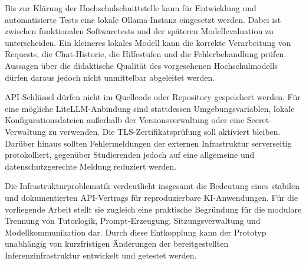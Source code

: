 Bis zur Klärung der Hochschulschnittstelle kann für Entwicklung und automatisierte Tests eine lokale Ollama-Instanz eingesetzt werden. Dabei ist zwischen funktionalen Softwaretests und der späteren Modellevaluation zu unterscheiden. Ein kleineres lokales Modell kann die korrekte Verarbeitung von Requests, die Chat-Historie, die Hilfestufen und die Fehlerbehandlung prüfen. Aussagen über die didaktische Qualität des vorgesehenen Hochschulmodells dürfen daraus jedoch nicht unmittelbar abgeleitet werden.

API-Schlüssel dürfen nicht im Quellcode oder Repository gespeichert werden. Für eine mögliche LiteLLM-Anbindung sind stattdessen Umgebungsvariablen, lokale Konfigurationsdateien außerhalb der Versionsverwaltung oder eine Secret-Verwaltung zu verwenden. Die TLS-Zertifikatsprüfung soll aktiviert bleiben. Darüber hinaus sollten Fehlermeldungen der externen Infrastruktur serverseitig protokolliert, gegenüber Studierenden jedoch auf eine allgemeine und datenschutzgerechte Meldung reduziert werden.

Die Infrastrukturproblematik verdeutlicht insgesamt die Bedeutung eines stabilen und dokumentierten API-Vertrags für reproduzierbare KI-Anwendungen. Für die vorliegende Arbeit stellt sie zugleich eine praktische Begründung für die modulare Trennung von Tutorlogik, Prompt-Erzeugung, Sitzungsverwaltung und Modellkommunikation dar. Durch diese Entkopplung kann der Prototyp unabhängig von kurzfristigen Änderungen der bereitgestellten Inferenzinfrastruktur entwickelt und getestet werden.